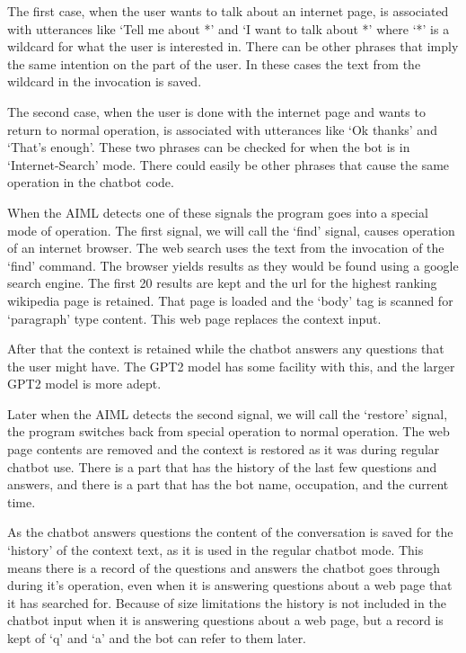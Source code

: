 The first case, when the user wants to talk about an internet page, is associated with utterances like `Tell me about *' and `I want to talk about *' where `*' is a wildcard for what the user is interested in. There can be other phrases that imply the same intention on the part of the user. In these cases the text from the wildcard in the invocation is saved.

The second case, when the user is done with the internet page and wants to return to normal operation, is associated with utterances like `Ok thanks' and `That's enough'. These two phrases can be checked for when the bot is in `Internet-Search' mode. There could easily be other phrases that cause the same operation in the chatbot code.

When the AIML detects one of these signals the program goes into a special mode of operation. The first signal, we will call the `find' signal, causes operation of an internet browser. The web search uses the text from the invocation of the `find' command. The browser yields results as they would be found using a google search engine. The first 20 results are kept and the url for the highest ranking wikipedia page is retained. That page is loaded and the `body' tag is scanned for `paragraph' type content. This web page replaces the context input. 

After that the context is retained while the chatbot answers any questions that the user might have. The GPT2 model has some facility with this, and the larger GPT2 model is more adept.

Later when the AIML detects the second signal, we will call the `restore' signal, the program switches back from special operation to normal operation. The web page contents are removed and the context is restored as it was during regular chatbot use. There is a part that has the history of the last few questions and answers, and there is a part that has the bot name, occupation, and the current time.

As the chatbot answers questions the content of the conversation is saved for the `history' of the context text, as it is used in the regular chatbot mode. This means there is a record of the questions and answers the chatbot goes through during it's operation, even when it is answering questions about a web page that it has searched for. Because of size limitations the history is not included in the chatbot input when it is answering questions about a web page, but a record is kept of `q' and `a' and the bot can refer to them later.

